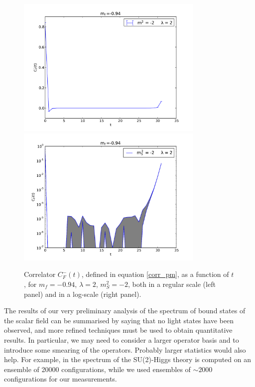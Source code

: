 \begin{figure}[thb] 
\begin{adjustwidth}{-4em}{-4em}
  \includegraphics[width=9cm,clip]{pics/spectrum_minus}\includegraphics[width=9cm,clip]{pics/spectrum_minus_log}
\end{adjustwidth}
  \caption{Correlator $C_F^-(t)$, defined in equation \ref{corr_pm}, as a function of $t$, for $m_f = -0.94$, $\lambda = 2$, $m_S^2 = -2$, both in a regular scale (left panel) and in a log-scale (right panel).}
  \label{spectrum_parity_minus}
\end{figure}


The results of our very preliminary analysis of the spectrum of bound states of the scalar field can be summarised by saying that no light states have been observed, and more refined techniques must be used to obtain quantitative results. In particular, we may need to consider a larger operator basis and to introduce some smearing of the operators. Probably larger statistics would also help. For example, in \cite{Wurtz:2013ova} the spectrum of the SU(2)-Higgs theory is computed on an ensemble of 20000 configurations, while we used ensembles of $\sim 2000$ configurations for our measurements.


